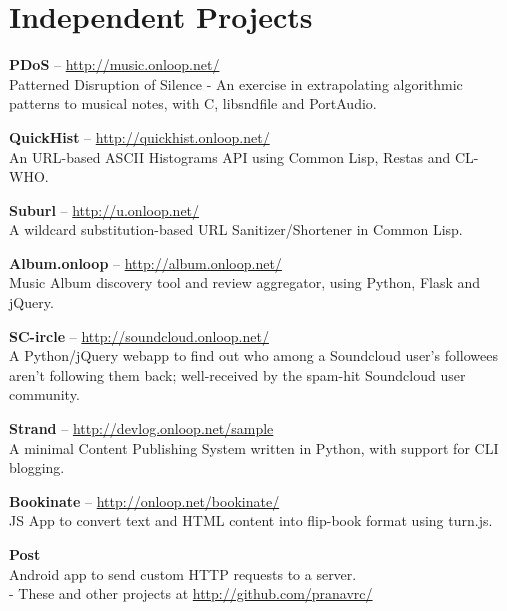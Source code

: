 \documentclass[10pt,a4paper]{moderncv}
\begin{document}

\section{Independent Projects}

\cvlistitem
{\textbf{PDoS} -- {{\href{http://music.onloop.net/}{\small http://music.onloop.net/}}}
  \\Patterned Disruption of Silence - An exercise in extrapolating algorithmic patterns to musical notes, with C, libsndfile and PortAudio.}

\cvlistitem
{\textbf{QuickHist} -- {{\href{http://quickhist.onloop.net/}{\small http://quickhist.onloop.net/}}}
  \\An URL-based ASCII Histograms API using Common Lisp, Restas and CL-WHO.}

\cvlistitem
{\textbf{Suburl} -- {{\href{http://u.onloop.net/}{\small
http://u.onloop.net/}}}
  \\A wildcard substitution-based URL Sanitizer/Shortener in Common Lisp.}

\cvlistitem
{\textbf{Album.onloop} -- {{\href{http://album.onloop.net/}{\small http://album.onloop.net/}}}
  \\Music Album discovery tool and review aggregator, using Python, Flask and jQuery.}

\cvlistitem
{\textbf{SC-ircle} -- {{\href{http://soundcloud.onloop.net/}{\small http://soundcloud.onloop.net/}}}
  \\A Python/jQuery webapp to find out who among a Soundcloud user's followees aren't following them back; well-received by the spam-hit Soundcloud user community.}

\cvlistitem
{\textbf{Strand} -- {{\href{http://devlog.onloop.net/sample}{\small http://devlog.onloop.net/sample}}}
  \\A minimal Content Publishing System written in Python, with support for CLI blogging.}

\cvlistitem
{\textbf{Bookinate} -- {{\href{http://onloop.net/bookinate}{\small http://onloop.net/bookinate/}}}
  \\JS App to convert text and HTML content into flip-book format using turn.js.}

\cvlistitem
{\textbf{Post}
 \\Android app to send custom HTTP requests to a server.\\ - These and other projects at {\href{http://github.com/pranavrc}{http://github.com/pranavrc/}}}
\end{document}
